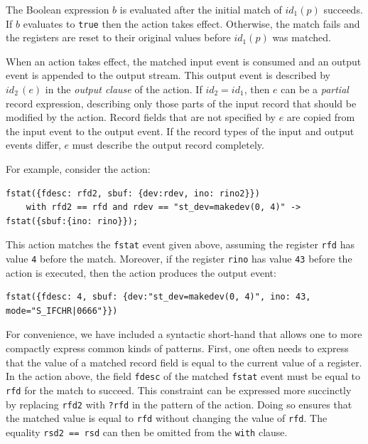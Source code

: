 The Boolean expression $b$ is evaluated after the initial match of $\mathit{id}_1(p)$ succeeds. If $b$ evaluates to \lstinline+true+ then the action takes effect. Otherwise, the match fails and the registers are reset to their original values before $\mathit{id}_1(p)$ was matched.

When an action takes effect, the matched input event is consumed and an output event is appended to the output stream. This output event is described by $\mathit{id}_2\,(e)$ in the \emph{output clause} of the action. If $\mathit{id}_2=\mathit{id}_1$, then $e$ can be a \emph{partial} record expression, describing only those parts of the input record that should be modified by the action. Record fields that are not specified by $e$ are copied from the input event to the output event. If the record types of the input and output events differ, $e$ must describe the output record completely.

For example, consider the action:
\begin{lstlisting}[numbers=none,xleftmargin=0em,gobble=2]
  fstat({fdesc: rfd2, sbuf: {dev:rdev, ino: rino2}})
    with rfd2 == rfd and rdev == "st_dev=makedev(0, 4)" -> fstat({sbuf:{ino: rino}});
    \end{lstlisting}
This action matches the \lstinline+fstat+ event given above, assuming the register \lstinline+rfd+ has value \lstinline+4+ before the match. Moreover, if the register \lstinline+rino+ has value \lstinline+43+ before the action is executed, then the action produces the output event:
\begin{lstlisting}[numbers=none,xleftmargin=0em,gobble=2]
  fstat({fdesc: 4, sbuf: {dev:"st_dev=makedev(0, 4)", ino: 43, mode="S_IFCHR|0666"}})
  \end{lstlisting}

For convenience, we have included a syntactic short-hand that allows one to more compactly express common kinds of patterns. First, one often needs to express that the value of a matched record field is equal to the current value of a register. In the action above, the field \lstinline+fdesc+ of the matched \lstinline+fstat+ event must be equal to \lstinline+rfd+ for the match to succeed. This constraint can be expressed more succinctly by replacing \lstinline+rfd2+ with \lstinline+?rfd+ in the pattern of the action. Doing so ensures that the matched value is equal to \lstinline+rfd+ without changing the value of \lstinline+rfd+. The equality \lstinline+rsd2 == rsd+ can then be omitted from the \lstinline+with+ clause.


